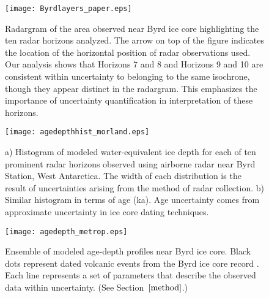 \documentclass[12pt]{article}
\begin{document}






\begin{figure}
\begin{center}
\texttt{[image: Byrdlayers\_paper.eps]}
\label{radargram}
\captionsetup{width=.9\textwidth}
\caption{Radargram of the area observed near Byrd ice core highlighting the ten radar horizons analyzed. The arrow on top of the figure indicates the location of the horizontal position of radar observations used. Our analysis shows that Horizons 7 and 8 and Horizons 9 and 10 are consistent within uncertainty to belonging to the same isochrone, though they appear distinct in the radargram. This emphasizes the importance of uncertainty quantification in interpretation of these horizons. }
\end{center}
\end{figure}


\begin{figure}
\begin{center}
\texttt{[image: agedepthhist\_morland.eps]}
\label{agedepthhist}
\captionsetup{width=.9\textwidth}
\caption{a) Histogram of modeled water-equivalent ice depth for each of ten prominent radar horizons observed using airborne radar near Byrd Station, West Antarctica. The width of each distribution is the result of uncertainties arising from the method of radar collection. b) Similar histogram in terms of age (ka). Age uncertainty comes from approximate uncertainty in ice core dating techniques. }
\end{center}
\end{figure}


\begin{figure}
\begin{center}
\texttt{[image: agedepth\_metrop.eps]}
\label{spaghetti}
\captionsetup{width=.9\textwidth}
\caption{ Ensemble of modeled age-depth profiles near Byrd ice core.  Black dots represent dated volcanic events from the Byrd ice core record \citep{hammer1994}. Each line represents a set of parameters that describe the observed data within uncertainty. (See Section~$\ref{method}$.)   }
\end{center}
\end{figure}
\end{document}
